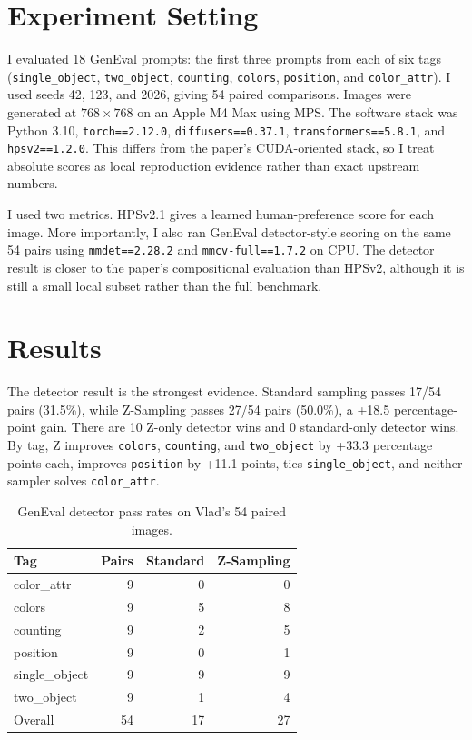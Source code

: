 \section{Experiment Setting}

I evaluated 18 GenEval prompts: the first three prompts from each of six tags (\texttt{single\_object}, \texttt{two\_object}, \texttt{counting}, \texttt{colors}, \texttt{position}, and \texttt{color\_attr}). I used seeds 42, 123, and 2026, giving 54 paired comparisons. Images were generated at $768\times768$ on an Apple M4 Max using MPS. The software stack was Python 3.10, \texttt{torch==2.12.0}, \texttt{diffusers==0.37.1}, \texttt{transformers==5.8.1}, and \texttt{hpsv2==1.2.0}. This differs from the paper's CUDA-oriented stack, so I treat absolute scores as local reproduction evidence rather than exact upstream numbers.

I used two metrics. HPSv2.1 gives a learned human-preference score for each image. More importantly, I also ran GenEval detector-style scoring on the same 54 pairs using \texttt{mmdet==2.28.2} and \texttt{mmcv-full==1.7.2} on CPU. The detector result is closer to the paper's compositional evaluation than HPSv2, although it is still a small local subset rather than the full benchmark.

\section{Results}

The detector result is the strongest evidence. Standard sampling passes 17/54 pairs (31.5\%), while Z-Sampling passes 27/54 pairs (50.0\%), a +18.5 percentage-point gain. There are 10 Z-only detector wins and 0 standard-only detector wins. By tag, Z improves \texttt{colors}, \texttt{counting}, and \texttt{two\_object} by +33.3 percentage points each, improves \texttt{position} by +11.1 points, ties \texttt{single\_object}, and neither sampler solves \texttt{color\_attr}.

\begin{table}[t]
\centering
\caption{GenEval detector pass rates on Vlad's 54 paired images.}
\label{tab:vlad-detector}
\begin{tabular}{lrrr}
\hline
Tag & Pairs & Standard & Z-Sampling \\
\hline
color\_attr & 9 & 0 & 0 \\
colors & 9 & 5 & 8 \\
counting & 9 & 2 & 5 \\
position & 9 & 0 & 1 \\
single\_object & 9 & 9 & 9 \\
two\_object & 9 & 1 & 4 \\
\hline
Overall & 54 & 17 & 27 \\
\hline
\end{tabular}
\end{table}

